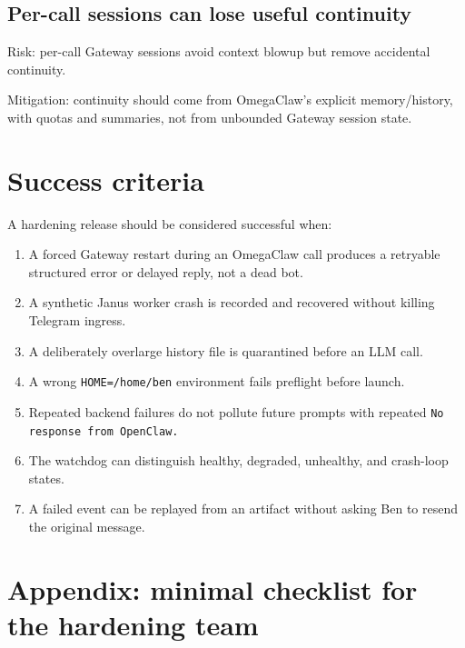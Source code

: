 \documentclass[11pt]{article}
\begin{document}
\subsection{Per-call sessions can lose useful continuity}

Risk: per-call Gateway sessions avoid context blowup but remove accidental continuity.

Mitigation: continuity should come from OmegaClaw's explicit memory/history, with quotas and summaries, not from unbounded Gateway session state.

\section{Success criteria}

A hardening release should be considered successful when:

\begin{enumerate}
  \item A forced Gateway restart during an OmegaClaw call produces a retryable structured error or delayed reply, not a dead bot.
  \item A synthetic Janus worker crash is recorded and recovered without killing Telegram ingress.
  \item A deliberately overlarge history file is quarantined before an LLM call.
  \item A wrong \texttt{HOME=/home/ben} environment fails preflight before launch.
  \item Repeated backend failures do not pollute future prompts with repeated \texttt{No response from OpenClaw.}
  \item The watchdog can distinguish healthy, degraded, unhealthy, and crash-loop states.
  \item A failed event can be replayed from an artifact without asking Ben to resend the original message.
\end{enumerate}

\section{Appendix: minimal checklist for the hardening team}
\end{document}
